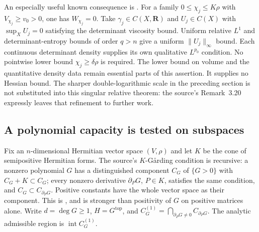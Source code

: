 An especially useful known consequence is
\cite[Corollary~3.19]{FangMaWu26DeterminantalV1}. For a family
$0\leq\chi_j\leq K\rho$ with $V_{\chi_j}\geq v_0>0$, one has
$W_{\chi_j}=0$. Take $\gamma_j\in C(X,\mathbf R)$ and
$U_j\in C(X)$ with $\sup_XU_j=0$ satisfying the determinant
viscosity bound. Uniform relative $L^1$ and determinant-entropy
bounds of order $q>n$ give a uniform $\|U_j\|_\infty$ bound.
Each continuous determinant density supplies its own qualitative
$L^{p_0}$ condition.
No pointwise lower bound $\chi_j\geq\delta\rho$ is required.
The lower bound on volume and the quantitative density data remain
essential parts of this assertion. It supplies no Hessian bound.
The sharper double-logarithmic scale in the preceding section is
not substituted into this singular relative theorem: the source's
Remark~3.20 expressly leaves that refinement to further work.

\subsection{A polynomial capacity is tested on subspaces}
\label{sec:ytd-determinantal-polymatroid}

Fix an $n$-dimensional Hermitian vector space $(V,\rho)$ and
let $K$ be the cone of semipositive Hermitian forms. The source's
$K$-G\aa rding condition is recursive: a nonzero polynomial $G$
has a distinguished component $C_G$ of $\{G>0\}$ with
$C_G+K\subset C_G$; every nonzero derivative $\partial_PG$,
$P\in K$, satisfies the same condition, and
$C_G\subset C_{\partial_PG}$. Positive constants have the whole
vector space as their component. This is
\cite[Definitions~4.4--4.5]{FangMaWu26DeterminantalV1}, and is
stronger than positivity of $G$ on positive matrices alone.
Write $d=\deg G\geq1$, $H=G^{\mathrm{top}}$, and
$C_G^{(1)}=\bigcap_{\partial_PG\ne0}C_{\partial_PG}$.
The analytic admissible region is $\operatorname{int}C_G^{(1)}$.

